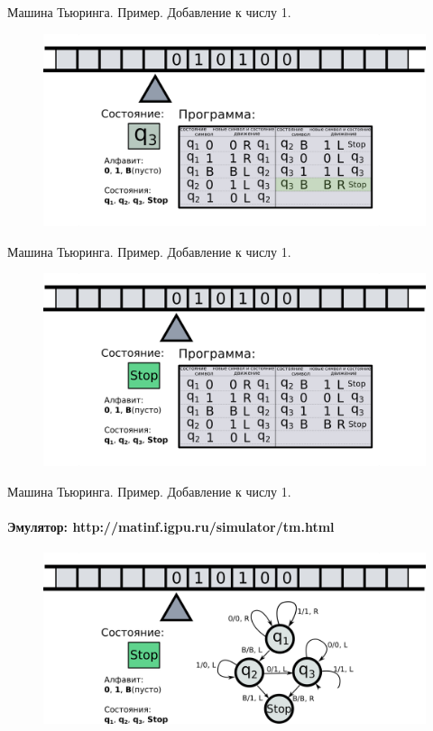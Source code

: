 \documentclass[10pt]{beamer}
\begin{document}
\begin{frame}{Машина Тьюринга. Пример. Добавление к числу 1.}
	\begin{figure}
		\centerline{\includegraphics[width=1.5\linewidth]{images/tm_ex_15.png}}
	\end{figure}
\end{frame}


\begin{frame}{Машина Тьюринга. Пример. Добавление к числу 1.}
	\begin{figure}
		\centerline{\includegraphics[width=1.5\linewidth]{images/tm_ex_16.png}}
	\end{figure}
\end{frame}

\begin{frame}{Машина Тьюринга. Пример. Добавление к числу 1.}
\framesubtitle{Эмулятор: http://matinf.igpu.ru/simulator/tm.html}
	\begin{figure}
		\centerline{\includegraphics[width=1.5\linewidth]{images/tm_ex_graph.png}}
	\end{figure}
\end{frame}
\end{document}
